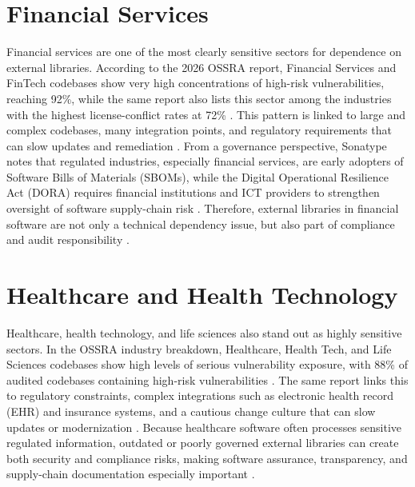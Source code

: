 \documentclass[12pt,a4paper]{report}
\begin{document}
\section{Financial Services}
Financial services are one of the most clearly sensitive sectors for dependence on external libraries. According to the 2026 OSSRA report, Financial Services and FinTech codebases show very high concentrations of high-risk vulnerabilities, reaching 92\%, while the same report also lists this sector among the industries with the highest license-conflict rates at 72\% \parencite{OpenSourceSecurity2026}. This pattern is linked to large and complex codebases, many integration points, and regulatory requirements that can slow updates and remediation \parencite{OpenSourceSecurity2026}. From a governance perspective, Sonatype notes that regulated industries, especially financial services, are early adopters of Software Bills of Materials (SBOMs), while the Digital Operational Resilience Act (DORA) requires financial institutions and ICT providers to strengthen oversight of software supply-chain risk \parencite{2026StateSoftware2026}. Therefore, external libraries in financial software are not only a technical dependency issue, but also part of compliance and audit responsibility \parencite{OpenSourceSecurity2026,2026StateSoftware2026}.

\section{Healthcare and Health Technology}
Healthcare, health technology, and life sciences also stand out as highly sensitive sectors. In the OSSRA industry breakdown, Healthcare, Health Tech, and Life Sciences codebases show high levels of serious vulnerability exposure, with 88\% of audited codebases containing high-risk vulnerabilities \parencite{OpenSourceSecurity2026}. The same report links this to regulatory constraints, complex integrations such as electronic health record (EHR) and insurance systems, and a cautious change culture that can slow updates or modernization \parencite{OpenSourceSecurity2026}. Because healthcare software often processes sensitive regulated information, outdated or poorly governed external libraries can create both security and compliance risks, making software assurance, transparency, and supply-chain documentation especially important \parencite{OpenSourceSecurity2026,2026StateSoftware2026}.
\end{document}
